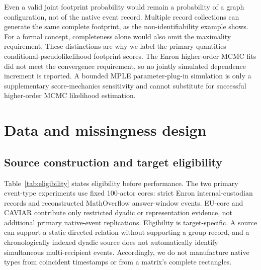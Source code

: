 \documentclass[10pt]{article}
\begin{document}
Even a valid joint footprint probability would remain a probability of a graph configuration, not of the native event record. Multiple record collections can generate the same complete footprint, as the non-identifiability example shows. For a formal concept, completeness alone would also omit the maximality requirement. These distinctions are why we label the primary quantities conditional-pseudolikelihood footprint scores. The Enron higher-order MCMC fits did not meet the convergence requirement, so no jointly simulated dependence increment is reported. A bounded MPLE parameter-plug-in simulation is only a supplementary score-mechanics sensitivity and cannot substitute for successful higher-order MCMC likelihood estimation.

\section{Data and missingness design}
\subsection{Source construction and target eligibility}
Table~\ref{tab:eligibility} states eligibility before performance. The two primary event-type experiments use fixed 100-actor cores: strict Enron internal-custodian records and reconstructed MathOverflow answer-window events. EU-core and CAVIAR contribute only restricted dyadic or representation evidence, not additional primary native-event replications. Eligibility is target-specific. A source can support a static directed relation without supporting a group record, and a chronologically indexed dyadic source does not automatically identify simultaneous multi-recipient events. Accordingly, we do not manufacture native types from coincident timestamps or from a matrix's complete rectangles.
\end{document}

